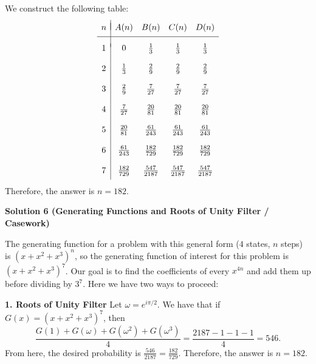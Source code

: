 \begin{enumerate}
 We construct the following table:
 \[\begin{array}{c|cccc}  &  &  &  & \\ [-2ex] n & A(n) & B(n) & C(n) & D(n) \\ [1ex] \hline  &  &  &  & \\ [-1ex] 1 & 0 & \frac13 & \frac13 & \frac13 \\  &  &  &  & \\ 2 & \frac13 & \frac29 & \frac29 & \frac29 \\  &  &  &  & \\ 3 & \frac29 & \frac{7}{27} & \frac{7}{27} & \frac{7}{27} \\  &  &  &  & \\ 4 & \frac{7}{27} & \frac{20}{81} & \frac{20}{81} & \frac{20}{81}\\  &  &  &  & \\ 5 & \frac{20}{81} & \frac{61}{243} & \frac{61}{243} & \frac{61}{243} \\  &  &  &  & \\ 6 & \frac{61}{243} & \frac{182}{729} & \frac{182}{729} & \frac{182}{729} \\  &  &  &  & \\ 7 & \frac{182}{729} & \frac{547}{2187} & \frac{547}{2187} & \frac{547}{2187} \\ [1ex] \end{array}\]Therefore, the answer is $n = \boxed{182}.$




\textbf{Solution 6 (Generating Functions and Roots of Unity Filter / Casework)}

The generating function for a problem with this general form ($4$ states, $n$ steps) is $(x+x^2+x^3)^n$, so the generating function of interest for this problem is $(x+x^2+x^3)^7$. Our goal is to find the coefficients of every $x^{4n}$ and add them up before dividing by $3^7$. Here we have two ways to proceed:

 \textbf{1. Roots of Unity Filter} Let $\omega = e^{i\pi / 2}$. We have that if $G(x) = (x+x^2+x^3)^7$, then 
 \[\frac{G(1) + G(\omega) + G(\omega^2) + G(\omega^3)}{4} = \frac{2187-1-1-1}{4} = 546.\] From here, the desired probability is $\frac{546}{2187} = \frac{182}{729}$. Therefore, the answer is $n=\boxed{182}$.


\end{enumerate}
